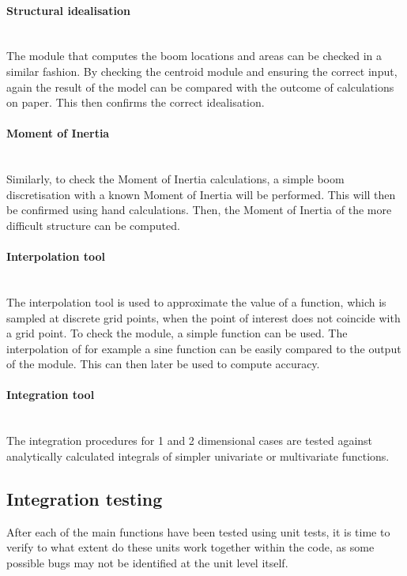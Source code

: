 \paragraph{Structural idealisation}\mbox{}\\
\noindent The module that computes the boom locations and areas can be checked in a similar fashion. By checking the centroid module and ensuring the correct input, again the result of the model can be compared with the outcome of calculations on paper. This then confirms the correct idealisation.

\paragraph{Moment of Inertia}\mbox{}\\
\noindent Similarly, to check the Moment of Inertia calculations, a simple boom discretisation with a known Moment of Inertia will be performed. This will then be confirmed using hand calculations. Then, the Moment of Inertia of the more difficult structure can be computed.

\paragraph{Interpolation tool}\mbox{}\\
\noindent The interpolation tool is used to approximate the value of a function, which is sampled at discrete grid points, when the point of interest does not coincide with a grid point. To check the module, a simple function can be used. The interpolation of for example a sine function can be easily compared to the output of the module. This can then later be used to compute accuracy.

\paragraph{Integration tool}\mbox{}\\
\noindent The integration procedures for 1 and 2 dimensional cases are tested against analytically calculated integrals of simpler univariate or multivariate functions.



\subsection{Integration testing}
After each of the main functions have been tested using unit tests, it is time to verify to what extent do these units work together within the code, as some possible bugs may not be identified at the unit level itself.

